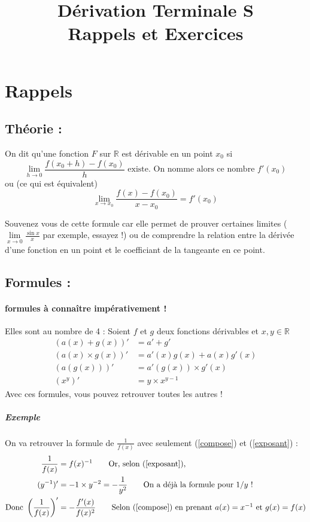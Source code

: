 \documentclass[11pt]{article}
\title{Dérivation Terminale S\\
        \large Rappels et Exercices}
\date{}
\author{}
\newcommand{\R}{\mathbb R}
\begin{document}
    
    \maketitle
    
    \section{Rappels}
        \subsection{Théorie :}
        On dit qu'une fonction $F$ sur $\R$ est dérivable en un point $x_0$ si
        \begin{equation}
            \lim\limits_{h \to 0} \frac{f(x_0 + h)-f(x_0)}{h} \text{ existe. On nomme alors ce nombre $f'(x_0)$} 
        \end{equation}
        ou (ce qui est équivalent)
        \begin{equation*}
            \lim\limits_{x \to x_0} \frac{f(x)-f(x_0)}{x-x_0} = f'(x_0)            
        \end{equation*}

        Souvenez vous de cette formule car elle permet de prouver certaines limites ($\lim\limits_{x \to 0} \frac{\sin{x}}{x}$ par exemple, essayez !) ou de comprendre la relation entre la dérivée d'une fonction en un point et le coefficiant de la tangeante en ce point.

        \subsection{Formules :}
        \paragraph{formules à connaître impérativement !}
        Elles sont au nombre de 4 : Soient $f$ et $g$ deux fonctions dérivables et $x,y \in  \R $
        \begin{align}
            (a(x) + g(x))' &= a' +g' \label{addition} \\
            (a(x) \times g(x))' &= a'(x)g(x) + a(x)g'(x) \label{produit}\\
            (a(g(x)))' &= a'(g(x))\times g'(x) \label{compose}\\
            (x^y)' &= y\times x^{y-1} \label{exposant}
        \end{align}
        Avec ces formules, vous pouvez retrouver toutes les autres !
        \subparagraph{Exemple} On va retrouver la formule de $\frac{1}{f(x)}$ avec seulement (\ref{compose}) et (\ref{exposant}) :
        \begin{align*}
            \frac{1}{f(x)} &= f(x)^{-1} \tag*{Or, selon (\ref{exposant}),}\\ 
            (y^{-1})' &= -1\times y^{-2} =-\frac{1}{y^2} \tag*{On a déjà la formule pour $1/y$ !}\\
            \text{Donc } \left(\frac{1}{f(x)}\right)' &=- \frac{f'(x)}{f(x)^2} \tag*{Selon (\ref{compose}) en prenant $a(x)=x^{-1}$ et $g(x)=f(x)$} 
        \end{align*}
\end{document}
